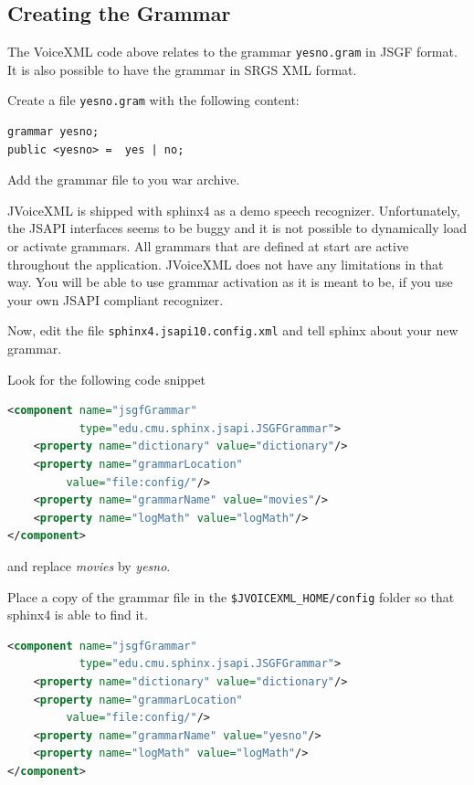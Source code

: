 \documentclass[11pt,a4paper]{article}
\begin{document}
\subsection{Creating the Grammar}
\label{sec:creating-grammar}

The VoiceXML code above relates to the grammar \texttt{yesno.gram} in JSGF
format. It is also possible to have the grammar in SRGS XML format.

Create a file \texttt{yesno.gram} with the following content:

\begin{lstlisting}
grammar yesno;
public <yesno> =  yes | no;

\end{lstlisting}

Add the grammar file to you war archive.

JVoiceXML is shipped with sphinx4 as a demo speech recognizer. Unfortunately,
the JSAPI interfaces seems to be buggy and it is not possible to dynamically
load or activate grammars. All grammars that are defined at start are active 
throughout the application. JVoiceXML does not have any limitations in that way.
You will be able to use grammar activation as it is meant to be, if you use your
own JSAPI compliant recognizer.

Now, edit the file \texttt{sphinx4.jsapi10.config.xml} and tell sphinx about
your new grammar.

Look for the following code snippet

\begin{lstlisting}[language=XML]
<component name="jsgfGrammar" 
           type="edu.cmu.sphinx.jsapi.JSGFGrammar">
    <property name="dictionary" value="dictionary"/>
    <property name="grammarLocation"
         value="file:config/"/>
    <property name="grammarName" value="movies"/>
    <property name="logMath" value="logMath"/>
</component>
\end{lstlisting}

and replace \emph{movies} by \emph{yesno}.

Place a copy of the grammar file in the \texttt{\$JVOICE\-XML\_HOME/config}
folder so that sphinx4 is able to find it.

\begin{lstlisting}[language=XML]
<component name="jsgfGrammar" 
           type="edu.cmu.sphinx.jsapi.JSGFGrammar">
    <property name="dictionary" value="dictionary"/>
    <property name="grammarLocation"
         value="file:config/"/>
    <property name="grammarName" value="yesno"/>
    <property name="logMath" value="logMath"/>
</component>
\end{lstlisting}
\end{document}

